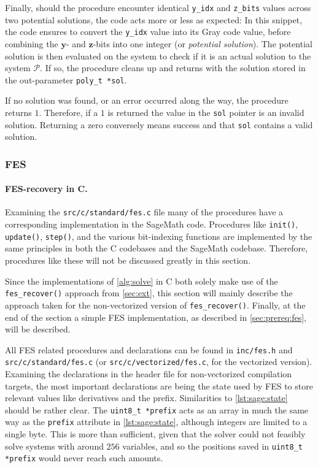 
Finally, should the procedure encounter identical \texttt{y\_idx} and \texttt{z\_bits} values across two potential solutions, the code acts more or less as expected:
In this snippet, the code ensures to convert the \texttt{y\_idx} value into its Gray code value, before combining the $\mathbf{y}$- and $\mathbf{z}$-bits into one integer (or \textit{potential solution}). The potential solution is then evaluated on the system to check if it is an actual solution to the system $\mathcal{P}$. If so, the procedure cleans up and returns with the solution stored in the out-parameter \texttt{poly\_t *sol}.

If no solution was found, or an error occurred along the way, the procedure returns $1$. Therefore, if a $1$ is returned the value in the \texttt{sol} pointer is an invalid solution. Returning a zero conversely means success and that \texttt{sol} contains a valid solution.

\subsubsection{FES} \label{sec:impl:c:fes}
\paragraph{FES-recovery in C.} Examining the \texttt{src/c/standard/fes.c} file many of the procedures have a corresponding implementation in the SageMath code. Procedures like \texttt{init()}, \texttt{update()}, \texttt{step()}, and the various bit-indexing functions are implemented by the same principles in both the C codebases and the SageMath codebase. Therefore, procedures like these will not be discussed greatly in this section.

Since the implementations of \cref{alg:solve} in C both solely make use of the \texttt{fes\_recover()} approach from \cref{sec:ext}, this section will mainly describe the approach taken for the non-vectorized version of \texttt{fes\_recover()}. Finally, at the end of the section a simple FES implementation, as described in \cref{sec:prereq:fes}, will be described.

All FES related procedures and declarations can be found in \texttt{inc/fes.h} and \texttt{src/c/standard/fes.c} (or \texttt{src/c/vectorized/fes.c}, for the vectorized version). Examining the declarations in the header file for non-vectorized compilation targets, the most important declarations are 
being the state used by FES to store relevant values like derivatives and the prefix. Similarities to \cref{lst:sage:state} should be rather clear. The \texttt{uint8\_t *prefix} acts as an array in much the same way as the \texttt{prefix} attribute in \cref{lst:sage:state}, although integers are limited to a single byte. This is more than sufficient, given that the solver could not feasibly solve systems with around $256$ variables, and so the positions saved in \texttt{uint8\_t *prefix} would never reach such amounts.

